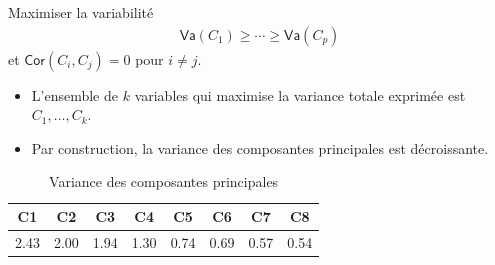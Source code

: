 \documentclass[
  ignorenonframetext,
]{beamer}
\providecommand{\tightlist}{%
  \setlength{\itemsep}{0pt}\setlength{\parskip}{0pt}}\usepackage{longtable,booktabs,array}
\begin{document}
\begin{frame}[fragile]{Maximiser la variabilité}
\protect\hypertarget{maximiser-la-variabilituxe9}{}
\begin{align*}
\mathsf{Va}(C_1) \geq \cdots \geq \mathsf{Va}(C_p)
\end{align*} et \(\mathsf{Cor}(C_i, C_j)=0\) pour \(i \neq j\).

\begin{itemize}
\tightlist
\item
  L'ensemble de \(k\) variables qui maximise la variance totale exprimée
  est \(C_1, \ldots, C_k\).
\item
  Par construction, la variance des composantes principales est
  décroissante.
\end{itemize}

\hypertarget{tbl-eigenvalues}{}
\begin{table}
\caption{\label{tbl-eigenvalues}Variance des composantes principales }\tabularnewline

\centering
\begin{tabular}[t]{cccccccc}
\toprule
C1 & C2 & C3 & C4 & C5 & C6 & C7 & C8\\
\midrule
2.43 & 2.00 & 1.94 & 1.30 & 0.74 & 0.69 & 0.57 & 0.54\\
\bottomrule
\end{tabular}
\end{table}
\end{frame}
\end{document}
